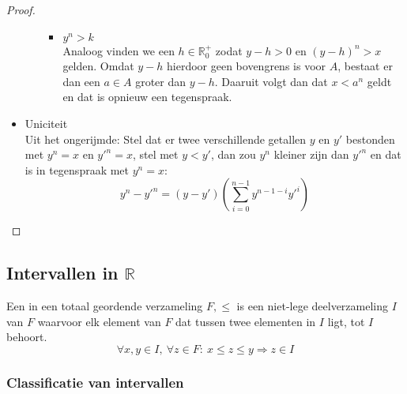 \documentclass[main.tex]{subfiles}
\begin{document}
\begin{st}
\begin{proof}
\begin{itemize}
\begin{itemize}
\begin{itemize}
        \item $y^{n}>k$\\
          Analoog vinden we een $h\in \mathbb{R}_{0}^{+}$ zodat $y-h>0$ en $(y-h)^{n}>x$ gelden.
          Omdat $y-h$ hierdoor geen bovengrens is voor $A$\waarom, bestaat er dan een $a\in A$ groter dan $y-h$.
          Daaruit volgt dan dat $x<a^{n}$ geldt en dat is opnieuw een tegenspraak.
        \end{itemize}
      \end{itemize}
    \item Uniciteit\\
      Uit het ongerijmde:
      Stel dat er twee verschillende getallen $y$ en $y'$ bestonden met $y^{n}=x$ en $y'^{n}=x$, stel met $y<y'$, dan zou $y^{n}$ kleiner zijn dan $y'^{n}$ en dat is in tegenspraak met $y^{n}=x$:\waarom
      \[ y^{n}-y'^{n} = (y-y')\left( \sum^{n-1}_{i=0}y^{n-1-i}y'^{i}\right) \]
    \end{itemize}
  \end{proof}
\end{st}

\subsection{Intervallen in $\mathbb{R}$}
\label{sec:intervallen-in-R}

\begin{de}
  Een  in een totaal geordende verzameling $F,\le$ is een niet-lege deelverzameling $I$ van $F$ waarvoor elk element van $F$ dat tussen twee elementen in $I$ ligt, tot $I$ behoort.
  \[ \forall x,y \in I,\ \forall z\in F:\ x \le z \le y \Rightarrow z\in I \]
\end{de}

\subsubsection{Classificatie van intervallen}
\label{sec:class-van-interv}
\end{document}
